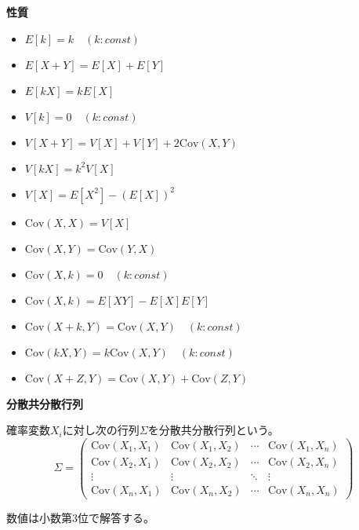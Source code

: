 \documentclass[12pt,b5paper]{ltjsarticle}
\begin{document}
\dotfill

\textbf{性質}

\begin{itemize}
 \item $E[k]=k \quad (k:const)$
 \item $E[X+Y]=E[X]+E[Y]$
 \item $E[kX]=kE[X]$
 \item $V[k]=0 \quad (k:const)$
 \item $V[X+Y]=V[X]+V[Y]+2\mathrm{Cov}(X,Y)$
 \item $V[kX]=k^2V[X]$
 \item $V[X]=E[X^2]-(E[X])^2$
 \item $\mathrm{Cov}(X,X)=V[X]$
 \item $\mathrm{Cov}(X,Y)=\mathrm{Cov}(Y,X)$
 \item $\mathrm{Cov}(X,k)=0 \quad (k:const)$
 \item $\mathrm{Cov}(X,k)=E[XY]-E[X]E[Y]$
 \item $\mathrm{Cov}(X+k,Y)=\mathrm{Cov}(X,Y) \quad (k:const)$
 \item $\mathrm{Cov}(kX,Y)=k\mathrm{Cov}(X,Y) \quad (k:const)$
 \item $\mathrm{Cov}(X+Z,Y)=\mathrm{Cov}(X,Y)+\mathrm{Cov}(Z,Y)$
\end{itemize}

\dotfill

\textbf{分散共分散行列}

確率変数$X_i$に対し次の行列$\Sigma$を分散共分散行列という。
\begin{equation}
 \Sigma =
  \begin{pmatrix}
   \mathrm{Cov}(X_1,X_1) & \mathrm{Cov}(X_1,X_2) & \cdots & \mathrm{Cov}(X_1,X_n)\\
   \mathrm{Cov}(X_2,X_1) & \mathrm{Cov}(X_2,X_2) & \cdots & \mathrm{Cov}(X_2,X_n)\\
   \vdots & \vdots & \ddots & \vdots \\
   \mathrm{Cov}(X_n,X_1) & \mathrm{Cov}(X_n,X_2) & \cdots & \mathrm{Cov}(X_n,X_n)
  \end{pmatrix}
\end{equation}


\hrulefill

数値は小数第3位で解答する。

\hrulefill
\end{document}
